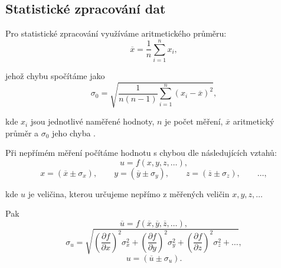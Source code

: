 \documentclass[english]{article}
\begin{document}
\subsection{Statistické zpracování dat}
	Pro statistické zpracování využíváme aritmetického průměru:
	\begin{equation} \label{eq:aritmeticky_prumer}
	\overline{x} = \frac{1}{n}\sum\limits_{i=1}^{n}x_i,
	\end{equation}
	
	jehož chybu spočítáme jako 
	\begin{equation} \label{eq:chyba_aritmetickeho_prumeru}
	\sigma_0 = \sqrt{\frac{1}{n(n-1)} \sum\limits_{i=1}^{n}\left( x_i - \overline{x} \right)^2 },
	\end{equation}
	
	kde $ x_i $ jsou jednotlivé naměřené hodnoty, $ n $ je počet měření, $ \overline{x} $ aritmetický průměr a $ \sigma_0 $ jeho chyba \cite{bib:chyby}.
	
Při nepřímém měření počítáme hodnotu s chybou dle následujících vztahů:
	\begin{equation}
	u = f(x, y, z, \ldots),
	\end{equation}
	\begin{displaymath}
	x = (\overline{x} \pm \sigma_x), \qquad
	y = (\overline{y} \pm \sigma_y), \qquad
	z = (\overline{z} \pm \sigma_z), \qquad
	\ldots,
	\end{displaymath}
	
	kde $ u $ je veličina, kterou určujeme nepřímo z měřených veličin $ x, y, z, \ldots $ 
	
	Pak
	\begin{displaymath}
	\overline{u} = f(\overline{x}, \overline{y}, \overline{z}, \ldots),
	\end{displaymath}
	\begin{equation}\label{eq:chyba_neprime_mereni}
	\sigma_u = \sqrt{\left( \frac{\partial f}{\partial x} \right)^2 \sigma^2_x + \left( \frac{\partial f}{\partial y} \right)^2 \sigma^2_y + \left( \frac{\partial f}{\partial z} \right)^2 \sigma^2_z + \ldots},
	\end{equation}
	\begin{displaymath}
	u = (\overline{u} \pm \sigma_ u).
	\end{displaymath}
%	
%	
%	 
%	
%	 
\end{document}
